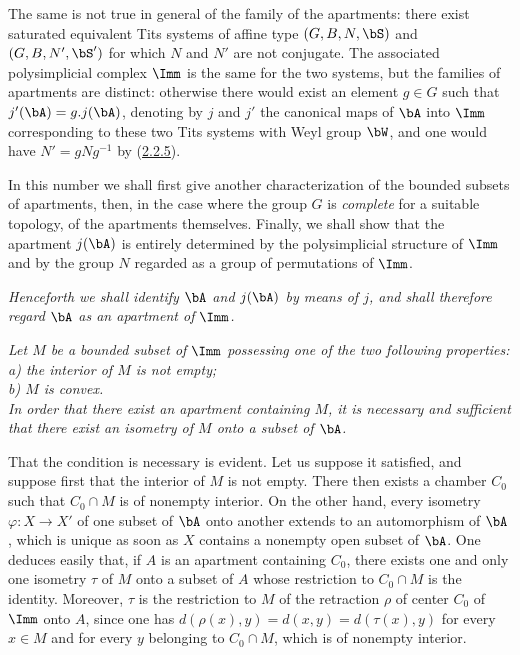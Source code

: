 \documentclass[12pt,a4paper,oneside,english]{smfart}
\makeatletter
\newcommand{\btanchor}[1]{\leavevmode\Hy@raisedlink{\hypertarget{bt:#1}{}}}
\newcommand{\btpageanchor}[1]{\Hy@raisedlink{\hypertarget{p:#1}{}}}
\newcommand{\btref}[1]{\hyperlink{bt:#1}{#1}}
\newcommand{\btpage}[1]{\marginnote{p.~#1}\btpageanchor{#1}}
\newcommand{\pagemark}[1]{\btpage{#1}}
\theoremstyle{definition}
\theoremstyle{bt}
\makeatother
\begin{document}
The same is not true in general of the family of the apartments: there exist
saturated equivalent Tits systems of affine type $(G,B,N,\bS)$ and
$(G,B,N',\bS')$ for which $N$ and $N'$ are not conjugate. The associated
polysimplicial complex $\Imm$ is the same for the two systems, but the
families of apartments are distinct: otherwise there would exist an element
$g\in G$ such that $j'(\bA)=g.j(\bA)$, denoting by $j$ and $j'$ the canonical
maps
\pagemark{51}
of $\bA$ into $\Imm$ corresponding to these two Tits systems with Weyl group
$\bW$, and one would have $N'=gNg^{-1}$ by (\btref{2.2.5}).

In this number we shall first give another characterization of the bounded
subsets of apartments, then, in the case where the group $G$ is
\emph{complete} for a suitable topology, of the apartments themselves.
Finally, we shall show that the apartment $j(\bA)$ is entirely determined by
the polysimplicial structure of $\Imm$ and by the group $N$ regarded as a
group of permutations of $\Imm$.

\emph{Henceforth we shall identify $\bA$ and $j(\bA)$ by means of $j$, and
shall therefore regard $\bA$ as an apartment of $\Imm$.}

\btanchor{2.8.1}
\emph{Let $M$ be a bounded subset of $\Imm$ possessing one of the two
following properties:\\
a) the interior of $M$ is not empty;\\
b) $M$ is convex.\\
In order that there exist an apartment containing $M$, it is necessary and
sufficient that there exist an isometry of $M$ onto a subset of $\bA$.}

\medskip
That the condition is necessary is evident. Let us suppose it satisfied, and
suppose first that the interior of $M$ is not empty. There then exists a
chamber $C_0$ such that $C_0\cap M$ is of nonempty interior. On the other
hand, every isometry $\varphi:X\to X'$ of one subset of $\bA$ onto another
extends to an automorphism of $\bA$, which is unique as soon as $X$ contains a
nonempty open subset of $\bA$. One deduces easily that, if $A$ is an apartment
containing $C_0$, there exists one and only one isometry $\tau$ of $M$ onto a
subset of $A$ whose restriction to $C_0\cap M$ is the identity. Moreover,
$\tau$ is the restriction to $M$ of the retraction $\rho$ of center $C_0$ of
$\Imm$ onto $A$, since one has $d(\rho(x),y)=d(x,y)=d(\tau(x),y)$ for every
$x\in M$ and for every $y$ belonging to $C_0\cap M$, which is of nonempty
interior.
\end{document}
